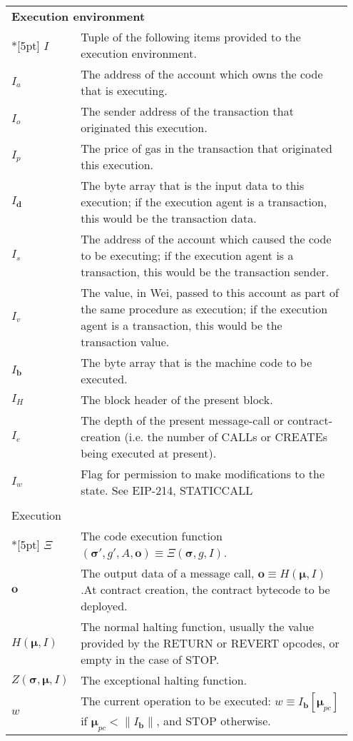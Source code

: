 \documentclass[9pt,oneside]{amsart}
\begin{document}
\begin{longtable}{p{0.10\linewidth}p{0.85\linewidth}}
\vspace{5pt} \\
\midrule
\multicolumn{2}{l}{\textbf{Execution environment}} \\*[5pt]
$I$ & Tuple of the following items provided to the execution environment. \\
$I_a$ & The address of the account which owns the code that is executing. \\
$I_o$ & The sender address of the transaction that originated this execution. \\
$I_p$ & The price of gas in the transaction that originated this execution. \\
$I_\mathbf{d}$ & The byte array that is the input data to this execution; if the execution agent is a transaction, this would be the transaction data. \\
$I_s$ & The address of the account which caused the code to be executing; if the execution agent is a transaction, this would be the transaction sender. \\
$I_v$ & The value, in Wei, passed to this account as part of the same procedure as execution; if the execution agent is a transaction, this would be the transaction value. \\
$I_\mathbf{b}$ & The byte array that is the machine code to be executed. \\
$I_H$ & The block header of the present block. \\
$I_e$ & The depth of the present message-call or contract-creation (i.e. the number of {\small CALL}s or {\small CREATE}s being executed at present). \\
$I_w$ & Flag for permission to make modifications to the state. See EIP-214, STATICCALL \\

\vspace{5pt} \\
\multicolumn{2}{l}{Execution} \\*[5pt]
$\Xi$ & The code execution function $(\boldsymbol{\sigma}', g', A, \mathbf{o}) \equiv \Xi(\boldsymbol{\sigma}, g, I)$. \\
$\mathbf{o}$ & The output data of a message call, $\mathbf{o} \equiv H(\boldsymbol{\mu}, I)$.\newline At contract creation, the contract bytecode to be deployed. \\
$H(\boldsymbol{\mu}, I)$ & The normal halting function, usually the value provided by the RETURN or REVERT opcodes, or empty in the case of STOP. \\
$Z(\boldsymbol{\sigma}, \boldsymbol{\mu}, I)$ & The exceptional halting function. \\
$w$ & The current operation to be executed: $w \equiv I_\mathbf{b}[\boldsymbol{\mu}_{pc}]$ if $\boldsymbol{\mu}_{pc} < \lVert I_\mathbf{b} \rVert$, and \small{STOP} otherwise. \\


\end{longtable}
\end{document}
